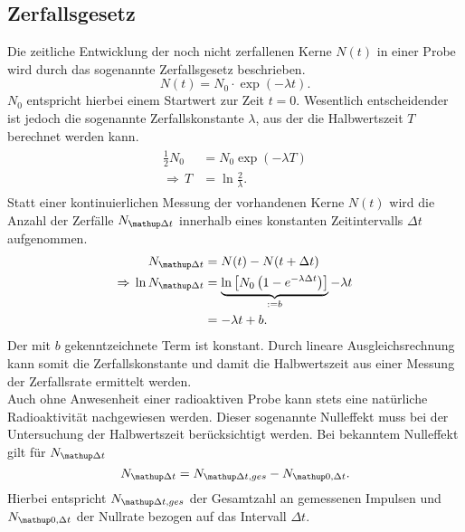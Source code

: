 \subsection{Zerfallsgesetz}
Die zeitliche Entwicklung der noch nicht zerfallenen Kerne $N(t)$ in einer Probe wird durch das sogenannte
Zerfallsgesetz beschrieben.
\begin{equation}
  N(t) = N_0 \cdot \exp\left(-\lambda t  \right).
  \label{eq: zerfallsgesetz}
\end{equation}
$N_0$ entspricht hierbei einem Startwert zur Zeit $t = 0$. Wesentlich entscheidender ist jedoch die sogenannte Zerfallskonstante $\lambda$,
aus der die Halbwertszeit $T$ berechnet werden kann.
\begin{align}
  \begin{aligned}
    \frac{1}{2} N_0 &= N_0 \exp\left(-\lambda T \right) \\
    \Rightarrow \, T &= \ln\frac{2}{\lambda}.
  \end{aligned}
  \label{eq: halbwertszeit}
\end{align}
Statt einer kontinuierlichen Messung der vorhandenen Kerne $N(t)$ wird die Anzahl der Zerfälle $N\ua{\Delta t}$ innerhalb eines
konstanten Zeitintervalls $\Delta t$ aufgenommen.
\begin{align}
  N\ua{\Delta t} &= N(t) - N(t + \Delta t) \\
  \Rightarrow \, \ln N\ua{\Delta t} &= \underbrace{\ln\left[N_0\left(1 - e^{-\lambda \Delta t} \right) \right]}_{:=b} - \lambda t \label{eq: n_prozeitintervall}\\
  &= -\lambda t + b.
\end{align}
Der mit $b$ gekenntzeichnete Term ist konstant. Durch lineare Ausgleichsrechnung kann somit die Zerfallskonstante und damit die
Halbwertszeit aus einer Messung der Zerfallsrate ermittelt werden. \\
Auch ohne Anwesenheit einer radioaktiven Probe kann stets eine natürliche Radioaktivität nachgewiesen werden. Dieser sogenannte
Nulleffekt muss bei der Untersuchung der Halbwertszeit berücksichtigt werden.
Bei bekanntem Nulleffekt gilt für $N\ua{\Delta t}$
\begin{equation}
  N\ua{\Delta t} = N\ua{\Delta t, ges} - N\ua{0, \Delta t}.
  \label{eq: nullrate}
\end{equation}
Hierbei entspricht $N\ua{\Delta t, ges}$ der Gesamtzahl an gemessenen Impulsen und $N\ua{0, \Delta t}$ der Nullrate
bezogen auf das Intervall $\Delta t$.

